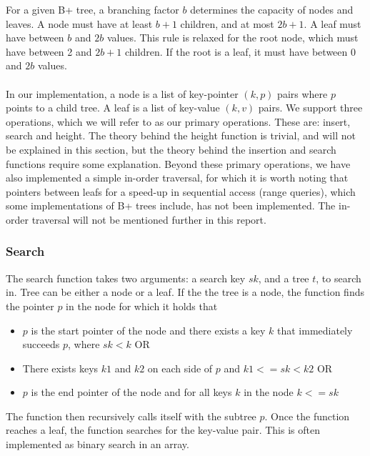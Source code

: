 For a given B+ tree, a branching factor $b$ determines the capacity of nodes and leaves. A node must have at least $b+1$ children, and at most $2b+1$. A leaf must have between $b$ and $2b$ values. This rule is relaxed for the root node, which must have between 2 and $2b+1$ children. If the root is a leaf, it must have between 0 and $2b$ values.

\paragraph{}
In our implementation, a node is a list of key-pointer $(k, p)$ pairs where $p$ points to a child tree. A leaf is a list of key-value $(k, v)$ pairs. We support three operations, which we will refer to as our primary operations. These are: insert, search and height. The theory behind the height function is trivial, and will not be explained in this section, but the theory behind the insertion and search functions require some explanation. Beyond these primary operations, we have also implemented a simple in-order traversal, for which it is worth noting that pointers between leafs for a speed-up in sequential access (range queries), which some implementations of B+ trees include, has not been implemented. The in-order traversal will not be mentioned further in this report. 

\subsubsection{Search}
\label{subsec:Search}
The search function takes two arguments: a search key $sk$, and a tree $t$, to search in. Tree can be either a node or a leaf. If the the tree is a node, the function finds the pointer $p$ in the node for which it holds that
\begin{itemize}
	\item $p$ is the start pointer of the node and there exists a key $k$ that immediately succeeds $p$, where $sk < k$ OR
	\item There exists keys $k1$ and $k2$ on each side of $p$ and $k1 <= sk < k2$ OR
	\item $p$ is the end pointer of the node and for all keys $k$ in the node $k <= sk$
\end{itemize}
The function then recursively calls itself with the subtree $p$. Once the function reaches a leaf, the function searches for the key-value pair. This is often implemented as binary search in an array. 

